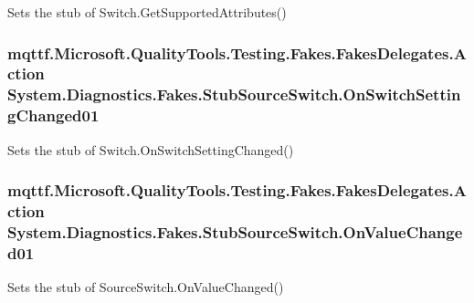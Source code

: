 Sets the stub of Switch.\-Get\-Supported\-Attributes()

\hypertarget{class_system_1_1_diagnostics_1_1_fakes_1_1_stub_source_switch_a9a243c56379b2f9f0bce61f77bf97573}{
\subsubsection[{On\-Switch\-Setting\-Changed01}]{\setlength{\rightskip}{0pt plus 5cm}mqttf.\-Microsoft.\-Quality\-Tools.\-Testing.\-Fakes.\-Fakes\-Delegates.\-Action System.\-Diagnostics.\-Fakes.\-Stub\-Source\-Switch.\-On\-Switch\-Setting\-Changed01}}\label{class_system_1_1_diagnostics_1_1_fakes_1_1_stub_source_switch_a9a243c56379b2f9f0bce61f77bf97573}


Sets the stub of Switch.\-On\-Switch\-Setting\-Changed()

\hypertarget{class_system_1_1_diagnostics_1_1_fakes_1_1_stub_source_switch_accf5b874ee08ae6177f2a9a5ed2c1082}{
\subsubsection[{On\-Value\-Changed01}]{\setlength{\rightskip}{0pt plus 5cm}mqttf.\-Microsoft.\-Quality\-Tools.\-Testing.\-Fakes.\-Fakes\-Delegates.\-Action System.\-Diagnostics.\-Fakes.\-Stub\-Source\-Switch.\-On\-Value\-Changed01}}\label{class_system_1_1_diagnostics_1_1_fakes_1_1_stub_source_switch_accf5b874ee08ae6177f2a9a5ed2c1082}


Sets the stub of Source\-Switch.\-On\-Value\-Changed()



